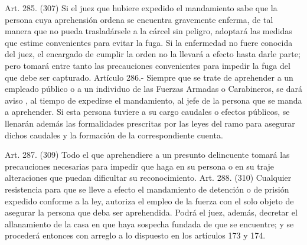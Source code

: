     Art. 285. (307) Si el juez que hubiere expedido el mandamiento sabe que la persona cuya aprehensión ordena se encuentra gravemente enferma, de tal manera que no pueda trasladársele a la cárcel sin peligro, adoptará las medidas que estime convenientes para evitar la fuga.
    Si la enfermedad no fuere conocida del juez, el encargado de cumplir la orden no la llevará a efecto hasta darle parte; pero tomará entre tanto las precauciones convenientes para impedir la fuga del que debe ser capturado.
    Artículo 286.- Siempre que se trate de aprehender a un empleado público o a un individuo de las Fuerzas Armadas o Carabineros, se dará aviso , al tiempo de expedirse el mandamiento, al jefe de la persona que se manda a aprehender.
    Si esta persona tuviere a su cargo caudales o efectos públicos, se llenarán además las formalidades prescritas por las leyes del ramo para asegurar dichos caudales y la formación de la correspondiente cuenta.

    Art. 287. (309) Todo el que aprehendiere a un presunto delincuente tomará las precauciones necesarias para impedir que haga en su persona o en su traje alteraciones que puedan dificultar su reconocimiento.
    Art. 288. (310) Cualquier resistencia para que se lleve a efecto el mandamiento de detención o de prisión expedido conforme a la ley, autoriza el empleo de la fuerza con el solo objeto de asegurar la persona que deba ser aprehendida.
    Podrá el juez, además, decretar el allanamiento de la casa en que haya sospecha fundada de que se encuentre; y se procederá entonces con arreglo a lo dispuesto en los artículos 173 y 174.

